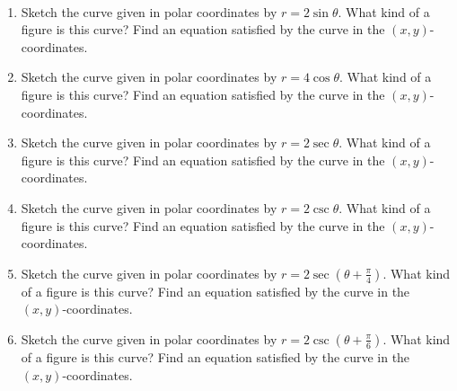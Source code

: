 ~\begin{enumerate}[ref={\fcProblemRef}]
\item Sketch the curve given in polar coordinates by $r=2\sin \theta $. What kind of a figure is this curve? Find an equation satisfied by the curve in the $(x,y)$-coordinates.
\item Sketch the curve given in polar coordinates by $r=4\cos \theta $. What kind of a figure is this curve? Find an equation satisfied by the curve in the $(x,y)$-coordinates.
\item \label{problemPolarSketchr=2sec(theta)}  Sketch the curve given in polar coordinates by $r=2\sec \theta $. What kind of a figure is this curve? Find an equation satisfied by the curve in the $(x,y)$-coordinates.
\item Sketch the curve given in polar coordinates by $r=2\csc \theta $. What kind of a figure is this curve? Find an equation satisfied by the curve in the $(x,y)$-coordinates.
\item \label{problemPolarSketchr=2sec(theta+pi/4)} Sketch the curve given in polar coordinates by $r=2\sec \left(\theta + \frac{\pi}{4} \right) $. What kind of a figure is this curve? Find an equation satisfied by the curve in the $(x,y)$-coordinates.

\item Sketch the curve given in polar coordinates by $r=2\csc\left(\theta +\frac{\pi}{6}\right)$. What kind of a figure is this curve? Find an equation satisfied by the curve in the $(x,y)$-coordinates.

\end{enumerate}

